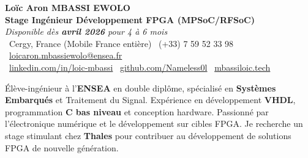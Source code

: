 \documentclass[a4paper,11pt]{article}
\begin{document}
\begin{center}
    {\Large \textbf{Loïc Aron MBASSI EWOLO}} \\ \vspace{4pt}
    \textbf{\large Stage Ingénieur Développement FPGA (MPSoC/RFSoC)} \\
    \textit{\small Disponible dès \textbf{avril 2026} pour 4 à 6 mois} \\ \vspace{4pt}
    \small
    \faMapMarker\ Cergy, France (Mobile France entière) \quad
    \faPhone\ (+33) 7 59 52 33 98 \quad
    \faEnvelope\ \href{mailto:loicaron.mbassiewolo@ensea.fr}{loicaron.mbassiewolo@ensea.fr} \\ \vspace{2pt}
    \faLinkedin\ \href{https://www.linkedin.com/in/loic-aron-mbassi-ewolo-3942a9246/}{linkedin.com/in/loic-mbassi} \quad
    \faGithub\ \href{https://github.com/Nameless0l}{github.com/Nameless0l} \quad
    \faGlobe\ \href{https://mbassiloic.tech}{mbassiloic.tech}
\end{center}

\vspace{-6pt}

\noindent\small{Élève-ingénieur à l'\textbf{ENSEA} en double diplôme, spécialisé en \textbf{Systèmes Embarqués} et Traitement du Signal. Expérience en développement \textbf{VHDL}, programmation \textbf{C bas niveau} et conception hardware. Passionné par l'électronique numérique et le développement sur cibles FPGA. Je recherche un stage stimulant chez \textbf{Thales} pour contribuer au développement de solutions FPGA de nouvelle génération.}

\end{document}
